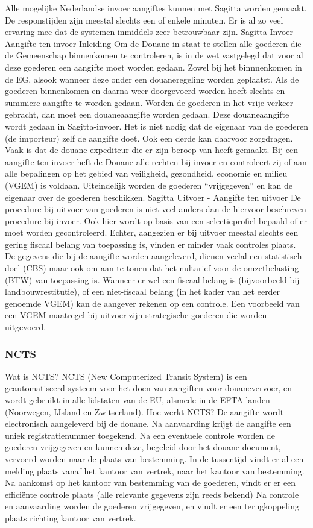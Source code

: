 Alle mogelijke Nederlandse invoer aangiftes kunnen met Sagitta worden gemaakt. De
responstijden zijn meestal slechts een of enkele minuten. Er is al zo veel ervaring mee
dat de systemen inmiddels zeer betrouwbaar zijn.
Sagitta Invoer - Aangifte ten invoer
Inleiding
Om de Douane in staat te stellen alle goederen die de Gemeenschap binnenkomen te
controleren, is in de wet vastgelegd dat voor al deze goederen een aangifte moet worden
gedaan. Zowel bij het binnnenkomen in de EG, alsook wanneer deze onder een douaneregeling
worden geplaatst. Als de goederen binnenkomen en daarna weer doorgevoerd worden hoeft
slechts en summiere aangifte te worden gedaan. Worden de goederen in het vrije verkeer
gebracht, dan moet een douaneaangifte worden gedaan. Deze douaneaangifte wordt gedaan in
Sagitta-invoer. Het is niet nodig dat de eigenaar van de goederen (de importeur) zelf de
aangifte doet. Ook een derde kan daarvoor zorgdragen. Vaak is dat de douane-expediteur
die er zijn beroep van heeft gemaakt. Bij een aangifte ten invoer heft de Douane alle
rechten bij invoer en controleert zij of aan alle bepalingen op het gebied van
veiligheid, gezondheid, economie en milieu (VGEM) is voldaan. Uiteindelijk worden de
goederen “vrijgegeven” en kan de eigenaar over de goederen beschikken.
Sagitta Uitvoer - Aangifte ten uitvoer
De procedure bij uitvoer van goederen is niet veel anders dan de hiervoor beschreven
procedure bij invoer. Ook hier wordt op basis van een selectieprofiel bepaald of er moet
worden gecontroleerd. Echter, aangezien er bij uitvoer meestal slechts een gering fiscaal
belang van toepassing is, vinden er minder vaak controles plaats. De gegevens die bij de
aangifte worden aangeleverd, dienen veelal een statistisch doel (CBS) maar ook om aan te
tonen dat het nultarief voor de omzetbelasting (BTW) van toepassing is. Wanneer er wel
een fiscaal belang is (bijvoorbeeld bij landbouwrestitutie), of een niet-fiscaal belang
(in het kader van het eerder genoemde VGEM) kan de aangever rekenen op een controle. Een
voorbeeld van een VGEM-maatregel bij uitvoer zijn strategische goederen die worden
uitgevoerd.

\subsubsection {NCTS}

Wat is NCTS?
NCTS (New Computerized Transit System) is een geautomatiseerd systeem  voor het doen van
aangiften voor douanevervoer, en wordt gebruikt in alle lidstaten van de EU, alsmede in
de EFTA-landen (Noorwegen, IJsland en Zwitserland).
Hoe werkt NCTS?
De aangifte wordt electronisch aangeleverd bij de douane. Na aanvaarding krijgt de
aangifte een uniek registratienummer toegekend. Na een eventuele controle worden de
goederen vrijgegeven en kunnen deze, begeleid door het douane-document, vervoerd worden
naar de plaats van bestemming. In de tussentijd vindt er al een melding plaats vanaf het
kantoor van vertrek, naar het kantoor van bestemming. Na aankomst op het kantoor van
bestemming van de goederen, vindt er er een efficiënte controle plaats (alle relevante
gegevens zijn reeds bekend) Na controle en aanvaarding worden de goederen vrijgegeven, en
vindt er een terugkoppeling plaats richting kantoor van vertrek.


